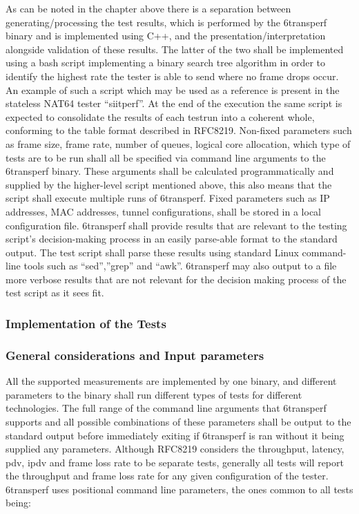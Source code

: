 \documentclass[a4paper,12p,titlepage]{article}
\begin{document}
As can be noted in the chapter above there is a separation between generating/processing the test results, which is performed by the 6transperf binary and is implemented using C++, and the presentation/interpretation alongside validation of these results. The latter of the two shall be implemented using a bash script implementing a binary search tree algorithm in order to identify the highest rate the tester is able to send where no frame drops occur. An example of such a script which may be used as a reference is present in the stateless NAT64 tester “siitperf”. At the end of the execution the same script is expected to consolidate the results of each testrun into a coherent whole, conforming to the table format described in RFC8219.
Non-fixed parameters such as frame size, frame rate, number of queues, logical core allocation, which type of tests are to be run shall all be specified via command line arguments to the 6transperf binary. These arguments shall be calculated programmatically and supplied by the higher-level script mentioned above, this also means that the script shall execute multiple runs of 6transperf. Fixed parameters such as IP addresses, MAC addresses, tunnel configurations, shall be stored in a local configuration file. 6transperf shall provide results that are relevant to the testing script’s decision-making process in an easily parse-able format to the standard output. The test script shall parse these results using standard Linux command-line tools such as “sed”,”grep” and “awk”. 6transperf may also output to a file more verbose results that are not relevant for the decision making process of the test script as it sees fit.

\subsubsection{Implementation of the Tests}
\subsubsection{General considerations and Input parameters}

All the supported measurements are implemented by one binary, and different parameters to the binary shall run different types of tests for different technologies. The full range of the command line arguments that 6transperf supports and all possible combinations of these parameters shall be output to the standard output before immediately exiting if 6transperf is ran without it being supplied any parameters. Although RFC8219 considers the throughput, latency, pdv, ipdv and frame loss rate to be separate tests, generally all tests will report the throughput and frame loss rate for any given configuration of the tester. 6transperf uses positional command line parameters, the ones common to all tests being:
\end{document}
